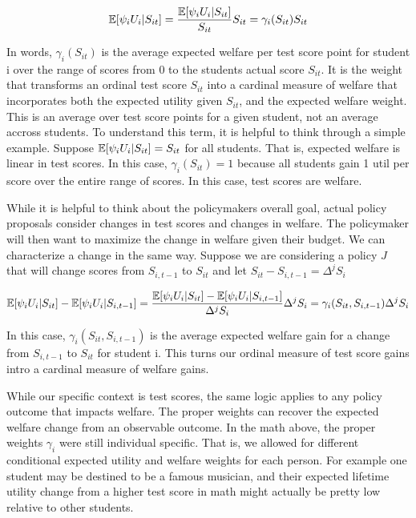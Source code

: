 \documentclass{article}
\theoremstyle{definition}
\theoremstyle{definition}
\theoremstyle{definition}
\theoremstyle{definition}
\begin{document}
    \begin{equation}
         \mathbb{E}[ \psi_i U_{i} |S_{it}] = \frac{\mathbb{E}[ \psi_i U_{i} |S_{it}]}{S_{it}} S_{it} = \gamma_i(S_{it}) S_{it}
    \end{equation}

    
    In words, $\gamma_i(S_{it})$  is the average expected welfare per test score point for student i over the range of scores from 0 to the students actual score $S_{it}$. It is the weight that transforms an ordinal test score $S_{it}$ into a cardinal measure of welfare that incorporates both the expected utility given $S_{it}$, and the expected welfare weight. This is an average over test score points for a given student, not an average accross students. To understand this term, it is helpful to think through a simple example. Suppose  $ \mathbb{E}[ \psi_i U_{i} |S_{it}]= S_{it}$ for all students. That is, expected welfare is linear in test scores. In this case,  $\gamma_i(S_{it}) = 1$ because all students gain 1 util per score over the entire range of scores. In this case, test scores are welfare. 
  
    While it is helpful to think about the policymakers overall goal, actual policy proposals consider changes in test scores and changes in welfare. The policymaker will then want to maximize the change in welfare given their budget. We can characterize a change in the same way. Suppose we are considering a policy $J$ that will change scores from $S_{i,t-1}$ to $S_{it}$ and let $S_{it} - S_{i,t-1} = \Delta^jS_i$
    
    \begin{equation}
        \mathbb{E}[\psi_i U_i|S_{it}] - \mathbb{E}[\psi_i U_i |S_{i,t-1}] =  \frac{\mathbb{E}[\psi_i U_i|S_{it}] - \mathbb{E}[\psi_i U_i |S_{i,t-1}] }{\Delta^jS_i} \Delta^jS_i = \gamma_i(S_{it}, S_{i,t-1}) \Delta^jS_i
    \end{equation}
 
    In this case, $\gamma_i(S_{it}, S_{i,t-1})$ is the average expected welfare gain for a change from $S_{i,t-1}$ to $S_{it}$ for student i. This turns our ordinal measure of test score gains intro a cardinal measure of welfare gains. 
 

    While our specific context is test scores, the same logic applies to any policy outcome that impacts welfare. The proper weights can recover the expected welfare change from an observable outcome. In the math above, the proper weights  $\gamma_i$ were still individual specific. That is, we allowed for different conditional expected utility and welfare weights for each person. For example one student may be destined to be a famous musician, and their expected lifetime utility change from a higher test score in math might actually be pretty low relative to other students. 
    
\end{document}
